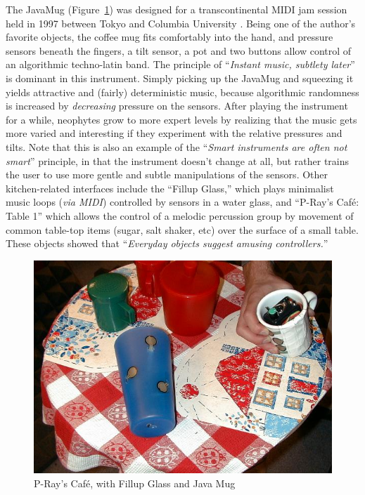 The JavaMug (Figure~\ref{Cook:cook-fig:6}) was designed for a transcontinental MIDI jam session held
in 1997 between Tokyo and Columbia University \cite{Goto:1997}.  Being one of the author's
favorite objects, the coffee mug fits comfortably into the hand, and pressure
sensors beneath the fingers, a tilt sensor, a pot and two buttons allow control
of an algorithmic techno-latin band.   The principle of ``\textit{Instant music,
subtlety later}'' is dominant in this instrument.  Simply picking up the JavaMug
and squeezing it yields attractive and (fairly) deterministic music, because
algorithmic randomness is increased by \textit{decreasing} pressure on the
sensors.  After playing the instrument for a while, neophytes grow to more expert
levels by realizing that the music gets more varied and interesting if they
experiment with the relative pressures and tilts.  Note that this is also an
example of the ``\textit{Smart instruments are often not smart}'' principle, in
that the instrument doesn't change at all, but rather trains the user to use more
gentle and subtle manipulations of the sensors.  Other kitchen-related interfaces
include the ``Fillup Glass,'' which plays minimalist music loops (\textit{via
MIDI}) controlled by sensors in a water glass, and ``P-Ray's Caf\'{e}: Table 1''
which allows the control of a melodic percussion group by movement of common
table-top items (sugar, salt shaker, etc) over the surface of a small table. 
These objects showed that ``\textit{Everyday objects suggest amusing
controllers.}''

\begin{figure}[t]
\centering
\includegraphics[width=\textwidth]{Figure8P-RaysCafe.jpg}
\caption{P-Ray's Caf\'{e}, with Fillup Glass and Java Mug}
\label{Cook:cook-fig:6}       %
\end{figure}


